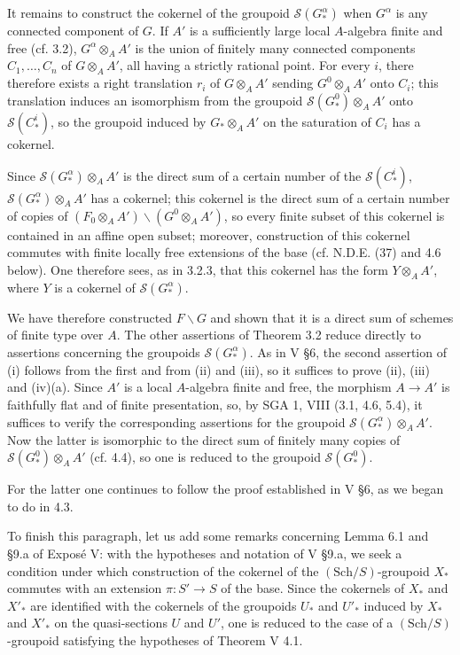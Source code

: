 It remains to construct the cokernel of the groupoid $\mathcal S(G^\alpha_*)$ when $G^\alpha$ is any connected component of $G$. If $A'$ is a sufficiently large local $A$-algebra finite and free (cf. 3.2), $G^\alpha\otimes_AA'$ is the union of finitely many connected components $C_1,\ldots,C_n$ of $G\otimes_AA'$, all having a strictly rational point. For every $i$, there therefore exists a right translation $r_i$ of $G\otimes_AA'$ sending $G^0\otimes_AA'$ onto $C_i$; this translation induces an isomorphism from the groupoid $\mathcal S(G^0_*)\otimes_AA'$ onto $\mathcal S(C^i_*)$, so the groupoid induced by $G_*\otimes_AA'$ on the saturation of $C_i$ has a cokernel.

Since $\mathcal S(G^\alpha_*)\otimes_AA'$ is the direct sum of a certain number of the $\mathcal S(C^i_*)$, $\mathcal S(G^\alpha_*)\otimes_AA'$ has a cokernel; this cokernel is the direct sum of a certain number of copies of $(F_0\otimes_AA')\backslash(G^0\otimes_AA')$, so every finite subset of this cokernel is contained in an affine open subset; moreover, construction of this cokernel commutes with finite locally free extensions of the base (cf. N.D.E. (37) and 4.6 below). One therefore sees, as in 3.2.3, that this cokernel has the form $Y\otimes_AA'$, where $Y$ is a cokernel of $\mathcal S(G^\alpha_*)$.

We have therefore constructed $F\backslash G$ and shown that it is a direct sum of schemes of finite type over $A$. The other assertions of Theorem 3.2 reduce directly to assertions concerning the groupoids $\mathcal S(G^\alpha_*)$. As in V §6, the second assertion of (i) follows from the first and from (ii) and (iii), so it suffices to prove (ii), (iii) and (iv)(a). Since $A'$ is a local $A$-algebra finite and free, the morphism $A\to A'$ is faithfully flat and of finite presentation, so, by SGA 1, VIII (3.1, 4.6, 5.4), it suffices to verify the corresponding assertions for the groupoid $\mathcal S(G^\alpha_*)\otimes_AA'$. Now the latter is isomorphic to the direct sum of finitely many copies of $\mathcal S(G^0_*)\otimes_AA'$ (cf. 4.4), so one is reduced to the groupoid $\mathcal S(G^0_*)$.

For the latter one continues to follow the proof established in V §6, as we began to do in 4.3.

To finish this paragraph, let us add some remarks concerning Lemma 6.1 and §9.a of Exposé V: with the hypotheses and notation of V §9.a, we seek a condition under which construction of the cokernel of the $(\mathrm{Sch}/S)$-groupoid $X_*$ commutes with an extension $\pi:S'\to S$ of the base. Since the cokernels of $X_*$ and $X'_*$ are identified with the cokernels of the groupoids $U_*$ and $U'_*$ induced by $X_*$ and $X'_*$ on the quasi-sections $U$ and $U'$, one is reduced to the case of a $(\mathrm{Sch}/S)$-groupoid satisfying the hypotheses of Theorem V 4.1.

